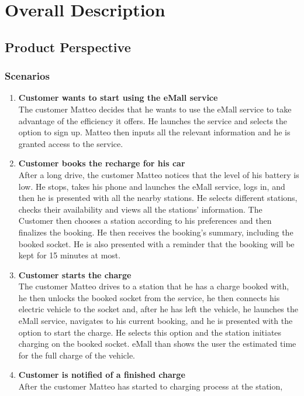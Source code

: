 \section{Overall Description}
\subsection{Product Perspective}
\subsubsection{Scenarios}
\begin{enumerate}
    \item \textbf{Customer wants to start using the eMall service}\\
    The customer Matteo decides that he wants to use the eMall service to 
    take advantage of the efficiency it offers. 
    He launches the service and selects the option to sign up. 
    Matteo then inputs all the relevant information and he is granted access to the service.
    \item \textbf{Customer books the recharge for his car}\\
    After a long drive, the customer Matteo notices that the level of his battery is low. 
    He stops, takes his phone and launches the eMall service, logs in, and then he is presented with all the nearby stations.
    He selects different stations, checks their availability and views all the stations' information. The Customer then chooses a station according to his preferences and then finalizes the booking.
    He then receives the booking's summary, including the booked socket. He is also presented with a reminder that the booking will be kept for 15 minutes at most.
    \item \textbf{Customer starts the charge}\\
    The customer Matteo drives to a station that he has a charge booked with, he then unlocks the booked socket from the service, he then connects his electric 
    vehicle to the socket and, after he has left the vehicle, he launches the eMall service, navigates to his current booking, and 
    he is presented with the option to start the charge. He selects this option and the station initiates charging on the booked socket. eMall than shows the user the estimated time for the full charge of the vehicle. 
    \item \textbf{Customer is notified of a finished charge}\\
    After the customer Matteo has started to charging process at the station,

\end{enumerate}
